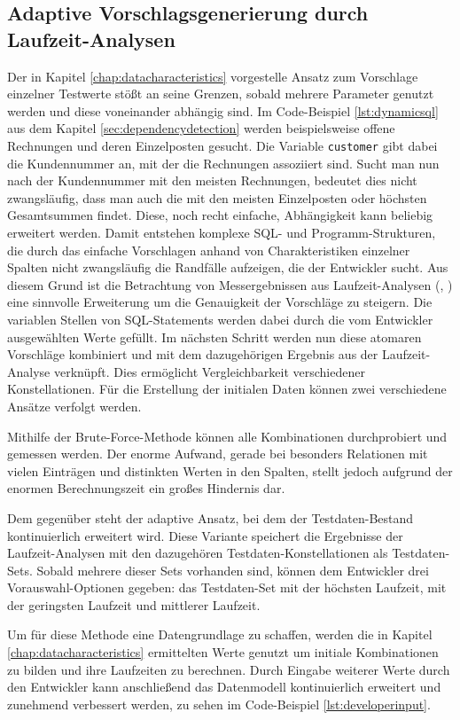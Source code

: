 \subsection{Adaptive Vorschlagsgenerierung durch Laufzeit-Analysen}\label{chap:adaptive}
Der in Kapitel \ref{chap:datacharacteristics} vorgestelle Ansatz zum Vorschlage einzelner Testwerte stößt an seine Grenzen, sobald mehrere Parameter genutzt werden und diese voneinander abhängig sind.
Im Code-Beispiel \ref{lst:dynamicsql} aus dem Kapitel \ref{sec:dependencydetection} werden beispielsweise offene Rechnungen und deren Einzelposten gesucht.
Die Variable \texttt{customer} gibt dabei die Kundennummer an, mit der die Rechnungen assoziiert sind.
Sucht man nun nach der Kundennummer mit den meisten Rechnungen, bedeutet dies nicht zwangsläufig, dass man auch die mit den meisten Einzelposten oder höchsten Gesamtsummen findet.
Diese, noch recht einfache, Abhängigkeit kann beliebig erweitert werden.
Damit entstehen komplexe SQL- und Programm-Strukturen, die durch das einfache Vorschlagen anhand von Charakteristiken einzelner Spalten nicht zwangsläufig die Randfälle aufzeigen, die der Entwickler sucht.
Aus diesem Grund ist die Betrachtung von Messergebnissen aus Laufzeit-Analysen (\cite{Exner2014}, \cite{Mues2014}) eine sinnvolle Erweiterung um die Genauigkeit der Vorschläge zu steigern.
Die variablen Stellen von SQL-Statements werden dabei durch die vom Entwickler ausgewählten Werte gefüllt.
Im nächsten Schritt werden nun diese atomaren Vorschläge kombiniert und mit dem dazugehörigen Ergebnis aus der Laufzeit-Analyse verknüpft.
Dies ermöglicht Vergleichbarkeit verschiedener Konstellationen.
Für die Erstellung der initialen Daten können zwei verschiedene Ansätze verfolgt werden.

Mithilfe der Brute-Force-Methode können alle Kombinationen durchprobiert und gemessen werden.
Der enorme Aufwand, gerade bei besonders Relationen mit vielen Einträgen und distinkten Werten in den Spalten, stellt jedoch aufgrund der enormen Berechnungszeit ein großes Hindernis dar.

Dem gegenüber steht der adaptive Ansatz, bei dem der Testdaten-Bestand kontinuierlich erweitert wird.
Diese Variante speichert die Ergebnisse der Laufzeit-Analysen mit den dazugehören Testdaten-Konstellationen als Testdaten-Sets.
Sobald mehrere dieser Sets vorhanden sind, können dem Entwickler drei Vorauswahl-Optionen gegeben: das Testdaten-Set mit der höchsten Laufzeit, mit der geringsten Laufzeit und mittlerer Laufzeit.

Um für diese Methode eine Datengrundlage zu schaffen, werden die in Kapitel \ref{chap:datacharacteristics} ermittelten Werte genutzt um initiale Kombinationen zu bilden und ihre Laufzeiten zu berechnen.
Durch Eingabe weiterer Werte durch den Entwickler kann anschließend das Datenmodell kontinuierlich erweitert und zunehmend verbessert werden, zu sehen im Code-Beispiel \ref{lst:developerinput}.


